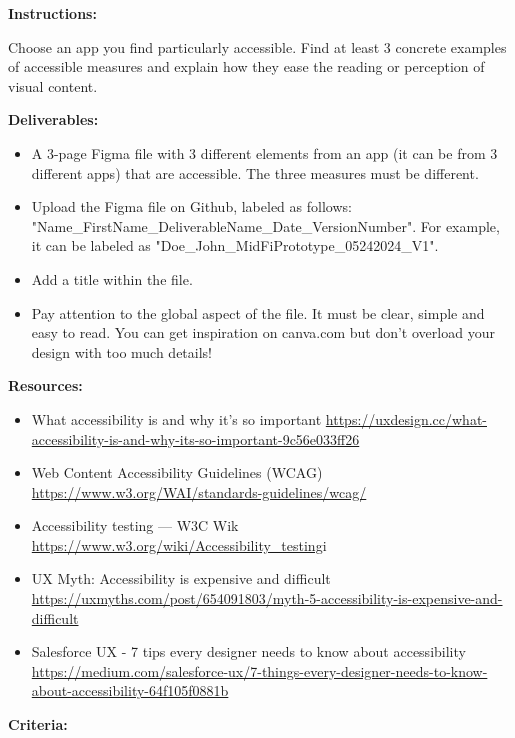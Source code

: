 \makeheaderfiles

\textbf{Instructions:}

Choose an app you find particularly accessible. Find at least 3 concrete examples of accessible measures and explain how they ease the reading or perception of visual content.

\textbf{Deliverables:}

\begin{itemize}
\item A 3-page Figma file with 3 different elements from an app (it can be from 3 different apps) that are accessible. The three measures must be different.
\item Upload the Figma file on Github, labeled as follows: "Name\_FirstName\_DeliverableName\_Date\_VersionNumber". For example, it can be labeled as "Doe\_John\_MidFiPrototype\_05242024\_V1".
\item Add a title within the file.
\item Pay attention to the global aspect of the file. It must be clear, simple and easy to read. You can get inspiration on canva.com but don't overload your design with too much details!
\end{itemize}

\textbf{Resources:}

\begin{itemize}
\item What accessibility is and why it's so important \url{https://uxdesign.cc/what-accessibility-is-and-why-its-so-important-9c56e033ff26}
\item Web Content Accessibility Guidelines (WCAG) \url{https://www.w3.org/WAI/standards-guidelines/wcag/}
\item Accessibility testing  ---  W3C Wik \url{https://www.w3.org/wiki/Accessibility_testing}i
\item UX Myth: Accessibility is expensive and difficult \url{https://uxmyths.com/post/654091803/myth-5-accessibility-is-expensive-and-difficult}
\item Salesforce UX - 7 tips every designer needs to know about accessibility \url{https://medium.com/salesforce-ux/7-things-every-designer-needs-to-know-about-accessibility-64f105f0881b}
\end{itemize}

\textbf{Criteria:}


